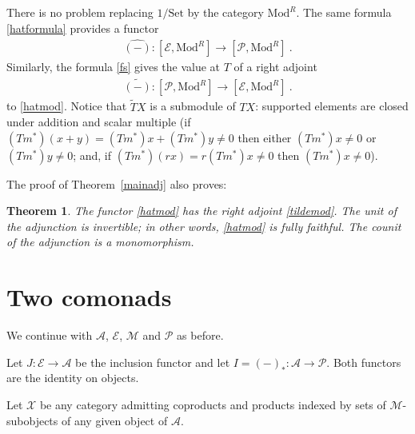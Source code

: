 \documentclass[a4paper,12pt,reqno]{amsart}
\newtheorem{theorem}{Theorem}[section] %
\theoremstyle{definition}
\theoremstyle{fact}
\theoremstyle{genquest}
\theoremstyle{step}
\newcommand{\lra}{\longrightarrow}
\def\CA{{\mathscr A}}
\def\CE{{\mathscr E}}
\def\CM{{\mathscr M}}
\def\CP{{\mathscr P}}
\def\CX{{\mathscr X}}
\begin{document}
There is no problem replacing $1/\mathrm{Set}$ by 
the category $\mathrm{Mod}^R$. The same formula \eqref{hatformula}
provides a functor
\begin{eqnarray}\label{hatmod}
\widehat{(-)} : [\CE, \mathrm{Mod}^R] \lra [\CP, \mathrm{Mod}^R] \ .
\end{eqnarray}
Similarly, the formula \eqref{fs} gives the value at $T$ of a right adjoint 
\begin{eqnarray}\label{tildemod}
\widetilde{(-)} : [\CP, \mathrm{Mod}^R] \lra [\CE, \mathrm{Mod}^R] \ .
\end{eqnarray}
to \eqref{hatmod}. Notice that $\widetilde{T}X$ is a submodule of $TX$: supported
elements are closed under addition and scalar multiple
(if $(Tm^*)(x+y)= (Tm^*)x+(Tm^*)y \neq 0$ then either $(Tm^*)x \neq 0$ or $(Tm^*)y \neq 0$; and, if $(Tm^*)(rx)= r(Tm^*)x \neq 0$ then $(Tm^*)x \neq 0$).   

The proof of Theorem~\ref{mainadj} also proves:
\begin{theorem}\label{modadj}
The functor \eqref{hatmod} has the right adjoint \eqref{tildemod}.
The unit of the adjunction is invertible; in other words, \eqref{hatmod} is fully faithful.
The counit of the adjunction is a monomorphism. 
\end{theorem}


\section{Two comonads}

We continue with $\CA$, $\CE$, $\CM$ and $\CP$ as before.
  
Let $J:\CE \lra \CA$ be the inclusion functor and let $I = (-)_* :\CA \lra \CP$.
Both functors are the identity on objects.

Let $\CX$ be any category admitting coproducts and products indexed by
sets of $\CM$-subobjects of any given object of $\CA$.
\end{document}
